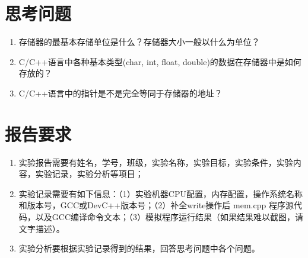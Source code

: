 \section{思考问题}

\begin{enumerate}
	\item 存储器的最基本存储单位是什么？存储器大小一般以什么为单位？
	\item C/C++语言中各种基本类型(char, int, float, double)的数据在存储器中是如何存放的？
	\item C/C++语言中的指针是不是完全等同于存储器的地址？
\end{enumerate}

\section{报告要求}

\begin{enumerate}
	\item 实验报告需要有姓名，学号，班级，实验名称，实验目标，实验条件，实验内容，实验记录，实验分析等项目；
	\item 实验记录需要有如下信息：（1）实验机器CPU配置，内存配置，操作系统名称和版本号，GCC或DevC++版本号；（2）补全write操作后 mem.cpp 程序源代码，以及GCC编译命令文本；（3）模拟程序运行结果（如果结果难以截图，请文字描述）。
	\item 实验分析要根据实验记录得到的结果，回答思考问题中各个问题。
\end{enumerate}

